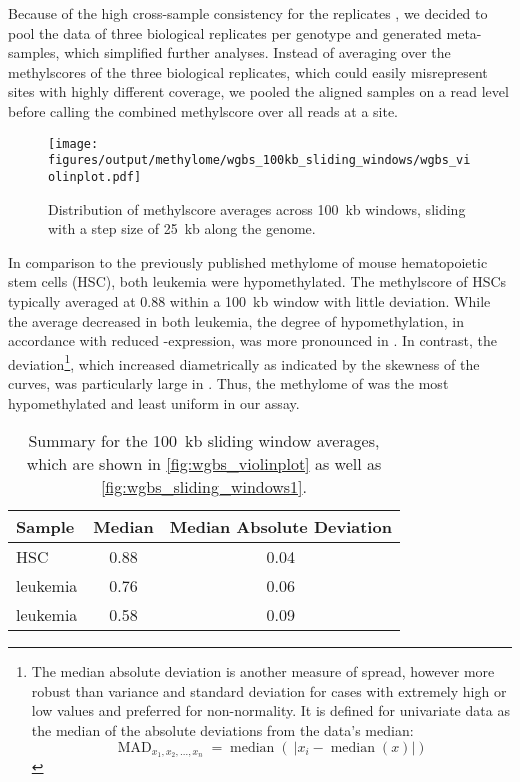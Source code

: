 Because of the high cross-sample consistency for the replicates \supple, we decided to pool the data of three biological replicates per genotype and generated meta-samples, which simplified further analyses. Instead of averaging over the methylscores of the three biological replicates, which could easily misrepresent sites with highly different coverage, we pooled the aligned samples on a read level before calling the combined methylscore over all reads at a site. 

\begin{figure}[!ht] 
	\centering
	\texttt{[image: figures/output/methylome/wgbs\_100kb\_sliding\_windows/wgbs\_violinplot.pdf]} 
	\caption[Violinplot of methylscore averages, \SI{100}{\kilo b} windows]{Distribution of methylscore averages across \SI{100}{\kilo b} windows, sliding with a step size of \SI{25}{\kilo b} along the genome.}
	\label{fig:wgbs_violinplot}
\end{figure}

In comparison to the previously published methylome of mouse hematopoietic stem cells (HSC)\cite{Jeong2014}, both leukemia were hypomethylated. The methylscore of \dnmtwt HSCs typically averaged at \num{0.88} within a \SI{100}{\kilo b} window with little deviation. While the average decreased in both leukemia, the degree of hypomethylation, in accordance with reduced -expression, was more pronounced in \dnmtchip. In contrast, the deviation\footnote{The median absolute deviation is another measure of spread, however more robust than variance and standard deviation for cases with extremely high or low values and preferred for non-normality. It is defined for univariate data as the median of the absolute deviations from the data's median:$$\operatorname{MAD}_{x_{1},x_{2},\ldots,x_{n}} = \operatorname{median}\left(\ \lvert x_{i} - \operatorname{median} (x) \rvert \right)\,$$}, which increased diametrically as indicated by the skewness of the curves, was particularly large in \dnmtchip {} . Thus, the methylome of \dnmtchip was the most hypomethylated and least uniform in our assay. 

\begin{table}[h!]
	\centering
	\begin{tabular}{lcc}
		\textbf{Sample} & \textbf{Median} & \textbf{Median Absolute Deviation} \\
		\hline
		\dnmtwt HSC & \num{0.88} & \num{0.04} \\
		\dnmtwt \kitpos leukemia & \num{0.76} & \num{0.06} \\
		\dnmtchip \kitpos leukemia & \num{0.58} & \num{0.09} \\
		\hline
	\end{tabular}
	\caption[Summary table of methylscore averages]{Summary for the \SI{100}{\kilo b} sliding window averages, which are shown in \autoref{fig:wgbs_violinplot} as well as \autoref{fig:wgbs_sliding_windows1}.}
	\label{tab:wgbs_violinplot}
\end{table}

